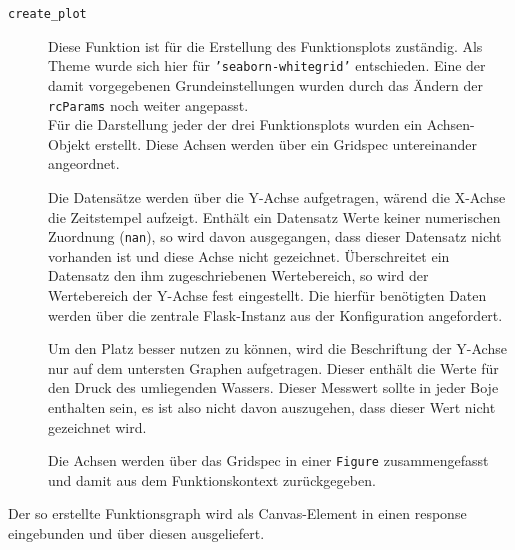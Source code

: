 \begin{description}
 \item [\texttt{create\_plot}]
    Diese Funktion ist für die Erstellung des Funktionsplots zuständig. Als Theme wurde sich hier für \texttt{'seaborn-whitegrid'} entschieden. Eine der damit vorgegebenen Grundeinstellungen wurden durch das Ändern der \texttt{rcParams} noch weiter angepasst.\\
    Für die Darstellung jeder der drei Funktionsplots wurden ein Achsen-Objekt erstellt. Diese Achsen werden über ein Gridspec untereinander angeordnet.

    Die Datensätze werden über die Y-Achse aufgetragen, wärend die X-Achse die Zeitstempel aufzeigt. Enthält ein Datensatz Werte keiner numerischen Zuordnung (\texttt{nan}), so wird davon ausgegangen, dass dieser Datensatz nicht vorhanden ist und diese Achse nicht gezeichnet. Überschreitet ein Datensatz den ihm zugeschriebenen Wertebereich, so wird der Wertebereich der Y-Achse fest eingestellt. Die hierfür benötigten Daten werden über die zentrale Flask-Instanz aus der Konfiguration angefordert.

    Um den Platz besser nutzen zu können, wird die Beschriftung der Y-Achse nur auf dem untersten Graphen aufgetragen. Dieser enthält die Werte für den Druck des umliegenden Wassers. Dieser Messwert sollte in jeder Boje enthalten sein, es ist also nicht davon auszugehen, dass dieser Wert nicht gezeichnet wird.

    Die Achsen werden über das Gridspec in einer \texttt{Figure} zusammengefasst und damit aus dem Funktionskontext zurückgegeben.
\end{description}

Der so erstellte Funktionsgraph wird als Canvas-Element in einen response eingebunden und über diesen ausgeliefert.







